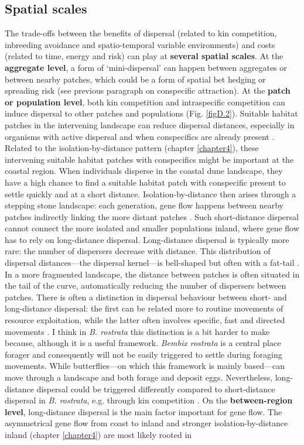 \documentclass[10pt, twoside]{book} %
\begin{document}
	\subsection{Spatial scales}
	The trade-offs between the benefits of dispersal (related to kin competition, inbreeding avoidance and spatio-temporal variable environments) and costs (related to time, energy and risk) can play at \textbf{several spatial scales}. At the \textbf{aggregate level}, a form of `mini-dispersal' can happen between aggregates or between nearby patches, which could be a form of spatial bet hedging or spreading risk (see previous paragraph on conspecific attraction). At the \textbf{patch or population level}, both kin competition and intraspecific competition can induce dispersal to other patches and populations (Fig. \ref{figD.2}). Suitable habitat patches in the intervening landscape can reduce dispersal distances, especially in organisms with active dispersal and when conspecifics are already present \citep{adriaensen2003, ims2005, mcrae2008, keller2012, bitume2013}. Related to the isolation-by-distance pattern (chapter \ref{chapter4}), these intervening suitable habitat patches with conspecifics might be important at the coastal region. When individuals disperse in the coastal dune landscape, they have a high chance to find a suitable habitat patch with conspecific present to settle quickly and at a short distance. Isolation-by-distance then arises through a stepping stone landscape: each generation, gene flow happens between nearby patches indirectly linking the more distant patches \citep{kimura1964}. Such short-distance dispersal cannot connect the more isolated and smaller populations inland, where gene flow has to rely on long-distance dispersal. Long-distance dispersal is typically more rare: the number of dispersers decrease with distance. This distribution of dispersal distances---the dispersal kernel---is bell-shaped but often with a fat-tail \citep{hovestadt2001, petrovskii2009, nathan2012, fronhofer2013}. In a more fragmented landscape, the distance between patches is often situated in the tail of the curve, automatically reducing the number of dispersers between patches. There is often a distinction in dispersal behaviour between short- and long-distance dispersal: the first can be related more to routine movements of resource exploitation, while the latter often involves specific, fast and directed movements \citep{vandyck2005}. I think in \textit{B. rostrata} this distinction is a bit harder to make because, although it is a useful framework. \textit{Bembix rostrata} is a central place forager and consequently will not be easily triggered to settle during foraging movements. While butterflies---on which this framework is mainly based---can move through a landscape and both forage and deposit eggs. Nevertheless, long-distance dispersal could be triggered differently compared to short-distance dispersal in \textit{B. rostrata}, e.g. through kin competition \citep{starrfelt2010, bitume2013}. On the \textbf{between-region level}, long-distance dispersal is the main factor important for gene flow. The asymmetrical gene flow from coast to inland and stronger isolation-by-distance inland (chapter \ref{chapter4}) are most likely rooted in 
\end{document}
